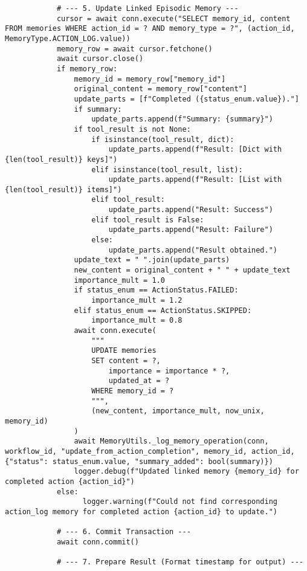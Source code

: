 \documentclass[12pt,a4paper]{article}
\begin{document}
\begin{pageablecode}
\begin{verbatim}
            # --- 5. Update Linked Episodic Memory ---
            cursor = await conn.execute("SELECT memory_id, content FROM memories WHERE action_id = ? AND memory_type = ?", (action_id, MemoryType.ACTION_LOG.value))
            memory_row = await cursor.fetchone()
            await cursor.close()
            if memory_row:
                memory_id = memory_row["memory_id"]
                original_content = memory_row["content"]
                update_parts = [f"Completed ({status_enum.value})."]
                if summary: 
                    update_parts.append(f"Summary: {summary}")
                if tool_result is not None:
                    if isinstance(tool_result, dict): 
                        update_parts.append(f"Result: [Dict with {len(tool_result)} keys]")
                    elif isinstance(tool_result, list): 
                        update_parts.append(f"Result: [List with {len(tool_result)} items]")
                    elif tool_result: 
                        update_parts.append("Result: Success")
                    elif tool_result is False: 
                        update_parts.append("Result: Failure")
                    else: 
                        update_parts.append("Result obtained.")
                update_text = " ".join(update_parts)
                new_content = original_content + " " + update_text
                importance_mult = 1.0
                if status_enum == ActionStatus.FAILED: 
                    importance_mult = 1.2
                elif status_enum == ActionStatus.SKIPPED: 
                    importance_mult = 0.8
                await conn.execute(
                    """
                    UPDATE memories
                    SET content = ?,
                        importance = importance * ?,
                        updated_at = ?
                    WHERE memory_id = ?
                    """,
                    (new_content, importance_mult, now_unix, memory_id)
                )
                await MemoryUtils._log_memory_operation(conn, workflow_id, "update_from_action_completion", memory_id, action_id, {"status": status_enum.value, "summary_added": bool(summary)})
                logger.debug(f"Updated linked memory {memory_id} for completed action {action_id}")
            else:
                  logger.warning(f"Could not find corresponding action_log memory for completed action {action_id} to update.")

            # --- 6. Commit Transaction ---
            await conn.commit()

            # --- 7. Prepare Result (Format timestamp for output) ---


\end{verbatim}
\end{pageablecode}
\end{document}
